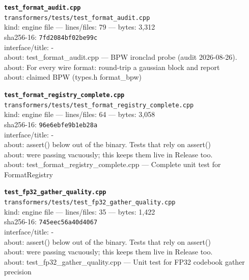 \noindent\textbf{\texttt{test\_format\_audit.cpp}}\\
\texttt{transformers/tests/test\_format\_audit.cpp}\\
kind: engine file --- lines/files: 79 --- bytes: 3,312\\
sha256-16: \texttt{7fd2084bf02be99c}\\
interface/title: -\\
about: test\_format\_audit.cpp — BPW ironclad probe (audit 2026-08-26).\\
about: For every wire format: round-trip a gaussian block and report\\
about: claimed BPW  (types.h format\_bpw)\\
\vspace*{6.0pt}
\newpage

\noindent\textbf{\texttt{test\_format\_registry\_complete.cpp}}\\
\texttt{transformers/tests/test\_format\_registry\_complete.cpp}\\
kind: engine file --- lines/files: 64 --- bytes: 3,058\\
sha256-16: \texttt{96e6ebfe9b1eb28a}\\
interface/title: -\\
about: assert() below out of the binary. Tests that rely on assert()\\
about: were passing vacuously; this keeps them live in Release too.\\
about: test\_format\_registry\_complete.cpp — Complete unit test for FormatRegistry\\
\vspace*{6.0pt}

\noindent\textbf{\texttt{test\_fp32\_gather\_quality.cpp}}\\
\texttt{transformers/tests/test\_fp32\_gather\_quality.cpp}\\
kind: engine file --- lines/files: 35 --- bytes: 1,422\\
sha256-16: \texttt{745eec56a40d4067}\\
interface/title: -\\
about: assert() below out of the binary. Tests that rely on assert()\\
about: were passing vacuously; this keeps them live in Release too.\\
about: test\_fp32\_gather\_quality.cpp — Unit test for FP32 codebook gather precision\\
\vspace*{6.0pt}

